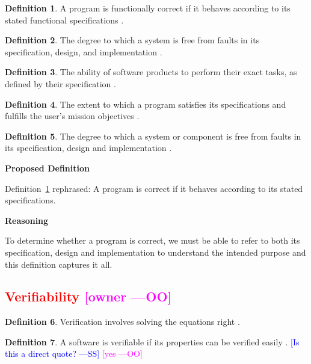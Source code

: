 \documentclass[letterpaper,cleveref]{lipics-v2019}
\newcommand{\authornote}[3]{\textcolor{#1}{[#3 ---#2]}}
\newcommand{\authornote}[3]{}
\newcommand{\wss}[1]{\authornote{blue}{SS}{#1}} %
\newcommand{\oo}[1]{\authornote{magenta}{OO}{#1}} %
\newcommand{\notdone}[1]{\textcolor{red}{#1}}
\theoremstyle{definition}
\newtheorem{defn}{Definition}
\begin{document}
\begin{defn} \label{Correctness_Selected}
  A program is functionally correct if it behaves according to its stated
  functional specifications \citep{GhezziEtAl2003}.  	
\end{defn}

\begin{defn}
  The degree to which a system is free from faults in its specification, design, and 
  implementation \citep{mcconnell2004code}.
\end{defn}

\begin{defn}
  The ability of software products to perform their exact tasks, as defined by
  their specification \citep{meyer1988object}.
\end{defn}

\begin{defn} 
  The extent to which a program satisfies its specifications and fulfills the
  user's mission objectives \citep{McCallEtAl1977}. 
\end{defn}

\begin{defn}  
  The degree to which a system or component is free from faults in its
  specification, design and implementation \citep{IEEEComputerDictionary1991}.
\end{defn}

\noindent \textbf{Proposed Definition}

Definition~\ref{Correctness_Selected} rephrased: A program is correct if it
behaves according to its stated specifications.

\noindent \textbf{Reasoning}

To determine whether a program is correct, we must be able to refer to both its
specification, design and implementation to understand the intended purpose and
this definition captures it all.

\subsection{\notdone{Verifiability} \oo{owner}}

\begin{defn}
	Verification involves solving the equations right \citep[p.~23]{Roache1998}.
\end{defn}

\begin{defn}
  A software is verifiable if its properties can be verified easily
  \citep{GhezziEtAl2003}.  \wss{Is this a direct quote?} \oo{yes}
\end{defn}
\end{document}
